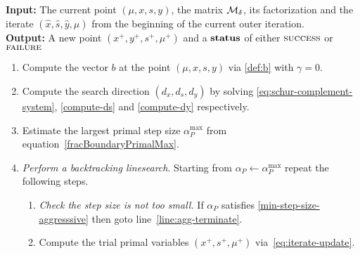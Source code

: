 \documentclass{article}
\begin{document}
\begin{algorithm}[H]
\textbf{Input:} The current point $(\mu, x, s, y)$, the matrix $\mathcal{M}_{\delta}$, its factorization and the iterate $(\hat{x}, \hat{s},  \hat{y}, \hat{\mu})$ from the beginning of the current outer iteration.  \\
\textbf{Output:} A new point $(x^{+}, y^{+}, s^{+}, \mu^{+})$ and a $\textbf{status}$ of either $\textsc{success}$ or $\textsc{failure}$
\begin{enumerate}[label*=A.{\arabic*}]
\item Compute the vector $b$ at the point $(\mu, x, s, y)$ via \eqref{def:b} with $\gamma = 0$.
\item Compute the search direction $(d_{x}, d_{s}, d_{y})$ by solving \eqref{eq:schur-complement-system}, \eqref{compute-ds} and \eqref{compute-dy} respectively.
\item Estimate the largest primal step size $\alpha^{\max}_{P}$ from equation~\eqref{fracBoundaryPrimalMax}.
\item \label{agg:line:back-track} \emph{Perform a backtracking linesearch}. Starting from $\alpha_{P} \gets \alpha^{\max}_{P}$ repeat the following steps.
\begin{enumerate}[label*=.{\arabic*}]
\item \label{line:agg-back-too-small} \emph{Check the step size is not too small.} If $\alpha_{P}$ satisfies \eqref{min-step-size-aggresssive} then goto line~\ref{line:agg-terminate}.
\item Compute the trial primal variables $(x^{+}, s^{+}, \mu^{+})$ via~\eqref{eq:iterate-update}.

\end{enumerate}
\end{enumerate}
\end{algorithm}
\end{document}
